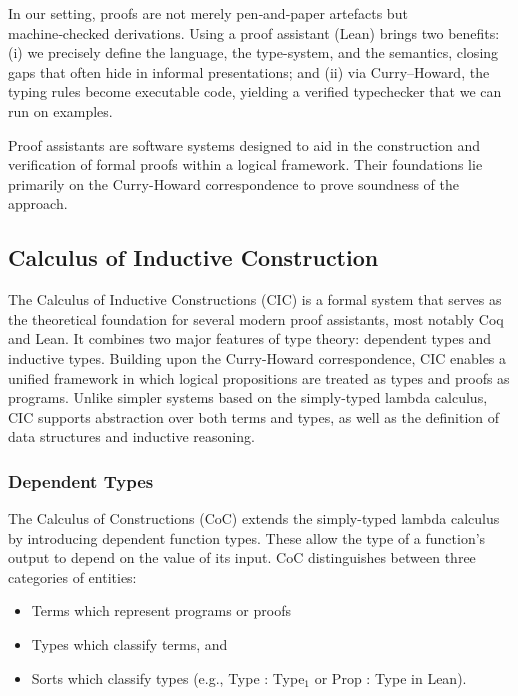 In our setting, proofs are not merely pen‑and‑paper artefacts but machine‑checked derivations.
Using a proof assistant (Lean) brings two benefits: (i) we precisely define the language, the type-system, and the semantics, closing gaps that often hide in informal presentations; and (ii) via Curry–Howard, the typing rules become executable code, yielding a verified typechecker that we can run on examples.

Proof assistants are software systems designed to aid in the construction and verification of formal proofs within a logical framework. Their foundations lie primarily on the Curry-Howard correspondence to prove soundness of the approach.
\subsection{Calculus of Inductive Construction}
The Calculus of Inductive Constructions (CIC) is a formal system that serves as the theoretical foundation for several modern proof assistants, most notably Coq and Lean.
It combines two major features of type theory: dependent types and inductive types. Building upon the Curry-Howard correspondence, CIC enables a unified framework in which logical propositions are treated as types and proofs as programs. Unlike simpler systems based on the simply-typed lambda calculus, CIC supports abstraction over both terms and types, as well as the definition of data structures and inductive reasoning.
\subsubsection{Dependent Types}
The Calculus of Constructions (CoC) extends the simply-typed lambda calculus by introducing dependent function types. These allow the type of a function's output to depend on the value of its input. CoC distinguishes between three categories of entities:
\begin{itemize}
	\item{Terms} which represent programs or proofs
	\item{Types} which classify terms, and
	\item{Sorts} which classify types (e.g., Type : Type$_1$ or Prop : Type in Lean).
\end{itemize}

